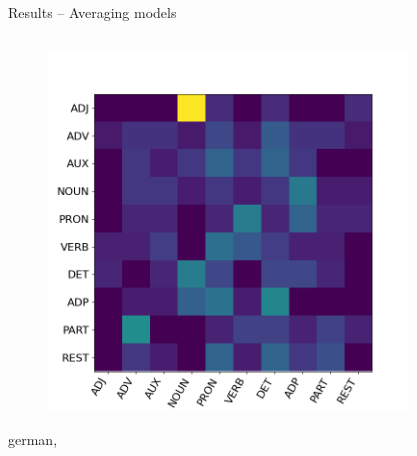 \begin{frame}{Results – Averaging models}
\begin{columns}
\begin{column}{0.33\textwidth}
\begin{figure}
                \includegraphics[width=1.1\columnwidth]{Bilder/average_models/Avg_OHE_OHE_5000E_100BS_1L_1C_200P_1500T_D/Transition_Probability_Matrix;_t=1,_DF=0.5.png}
            \end{figure}
            \begin{center}
                {\large german, \onehot{}} %
            \end{center}
        \end{column}
        \begin{column}{0.33\textwidth}
            \begin{figure}
                \centering

\end{figure}
\end{column}
\end{columns}
\end{frame}
